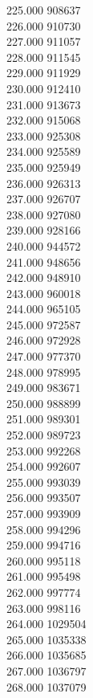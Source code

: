 { 225.000	908637 \\
 226.000	910730 \\
 227.000	911057 \\
 228.000	911545 \\
 229.000	911929 \\
 230.000	912410 \\
 231.000	913673 \\
 232.000	915068 \\
 233.000	925308 \\
 234.000	925589 \\
 235.000	925949 \\
 236.000	926313 \\
 237.000	926707 \\
 238.000	927080 \\
 239.000	928166 \\
 240.000	944572 \\
 241.000	948656 \\
 242.000	948910 \\
 243.000	960018 \\
 244.000	965105 \\
 245.000	972587 \\
 246.000	972928 \\
 247.000	977370 \\
 248.000	978995 \\
 249.000	983671 \\
 250.000	988899 \\
 251.000	989301 \\
 252.000	989723 \\
 253.000	992268 \\
 254.000	992607 \\
 255.000	993039 \\
 256.000	993507 \\
 257.000	993909 \\
 258.000	994296 \\
 259.000	994716 \\
 260.000	995118 \\
 261.000	995498 \\
 262.000	997774 \\
 263.000	998116 \\
 264.000	1029504 \\
 265.000	1035338 \\
 266.000	1035685 \\
 267.000	1036797 \\
 268.000	1037079 \\
}
